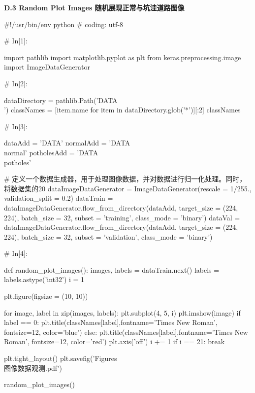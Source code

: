 \documentclass{MathorCupmodeling}
\begin{document}
\textbf{D.3 Random Plot Images 随机展现正常与坑洼道路图像}
\begin{python}
#!/usr/bin/env python
# coding: utf-8

# In[1]:


import pathlib
import matplotlib.pyplot as plt
from keras.preprocessing.image import ImageDataGenerator


# In[2]:


dataDirectory = pathlib.Path('DATA\\')
classNames = [item.name for item in dataDirectory.glob('*')][:2]
classNames


# In[3]:


dataAdd = 'DATA' 
normalAdd = 'DATA\\normal'
potholesAdd = 'DATA\\potholes'

# 定义一个数据生成器，用于处理图像数据，并对数据进行归一化处理。同时，将数据集的20%
dataImageDataGenerator = ImageDataGenerator(rescale = 1/255., validation_split = 0.2)
dataTrain = dataImageDataGenerator.flow_from_directory(dataAdd, target_size = (224, 224), batch_size = 32, subset = 'training', class_mode = 'binary')
dataVal = dataImageDataGenerator.flow_from_directory(dataAdd, target_size = (224, 224), batch_size = 32, subset = 'validation', class_mode = 'binary')


# In[4]:


def random_plot_images():
    images, labels = dataTrain.next()
    labels = labels.astype('int32')
    i = 1

    plt.figure(figsize = (10, 10))
    
    for image, label in zip(images, labels):
        plt.subplot(4, 5, i)
        plt.imshow(image)
        if label == 0:
            plt.title(classNames[label],fontname='Times New Roman', fontsize=12, color='blue')
        else:
            plt.title(classNames[label],fontname='Times New Roman', fontsize=12, color='red')
        plt.axis('off')
        i += 1
        if i == 21:
            break

    plt.tight_layout()       
    plt.savefig('Figures\\图像数据观测.pdf')


random_plot_images()

\end{python}
\end{document}
